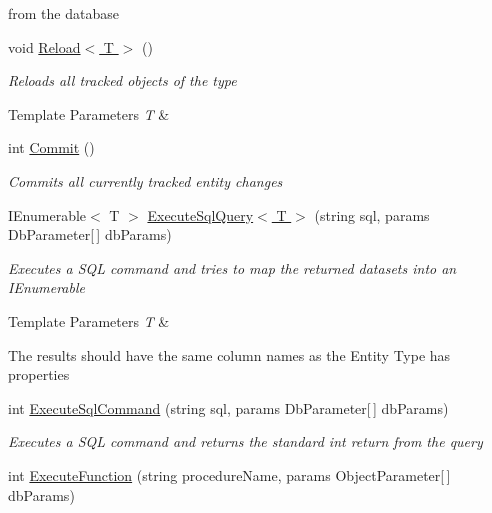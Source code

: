 \begin{DoxyCompactItemize}
\begin{DoxyCompactList}
from the database \end{DoxyCompactList}\item 
void \hyperlink{class_highway_1_1_data_1_1_entity_framework_1_1_tests_1_1_unit_tests_1_1_commit_events_mock_context_a842ae09488375d62a612d114ffcc1d81}{Reload$<$ T $>$} ()
\begin{DoxyCompactList}\small\item\em Reloads all tracked objects of the type 
\begin{DoxyTemplParams}{Template Parameters}
{\em T} & \\
\hline
\end{DoxyTemplParams}
\end{DoxyCompactList}\item 
int \hyperlink{class_highway_1_1_data_1_1_entity_framework_1_1_tests_1_1_unit_tests_1_1_commit_events_mock_context_aa9e129d42f59b4658e77bc138d1bf1e7}{Commit} ()
\begin{DoxyCompactList}\small\item\em Commits all currently tracked entity changes \end{DoxyCompactList}\item 
I\-Enumerable$<$ T $>$ \hyperlink{class_highway_1_1_data_1_1_entity_framework_1_1_tests_1_1_unit_tests_1_1_commit_events_mock_context_a71db94589eea07f87115e51e78f439ca}{Execute\-Sql\-Query$<$ T $>$} (string sql, params Db\-Parameter\mbox{[}$\,$\mbox{]} db\-Params)
\begin{DoxyCompactList}\small\item\em Executes a S\-Q\-L command and tries to map the returned datasets into an I\-Enumerable
\begin{DoxyTemplParams}{Template Parameters}
{\em T} & \\
\hline
\end{DoxyTemplParams}
The results should have the same column names as the Entity Type has properties \end{DoxyCompactList}\item 
int \hyperlink{class_highway_1_1_data_1_1_entity_framework_1_1_tests_1_1_unit_tests_1_1_commit_events_mock_context_a4f6eb19254fa1083c3aa6db113001a06}{Execute\-Sql\-Command} (string sql, params Db\-Parameter\mbox{[}$\,$\mbox{]} db\-Params)
\begin{DoxyCompactList}\small\item\em Executes a S\-Q\-L command and returns the standard int return from the query \end{DoxyCompactList}\item 
int \hyperlink{class_highway_1_1_data_1_1_entity_framework_1_1_tests_1_1_unit_tests_1_1_commit_events_mock_context_ac15d15e91e57c0021b275b55957830c1}{Execute\-Function} (string procedure\-Name, params Object\-Parameter\mbox{[}$\,$\mbox{]} db\-Params)
\begin{DoxyCompactList}\small\item\em \end{DoxyCompactList}\end{DoxyCompactItemize}
